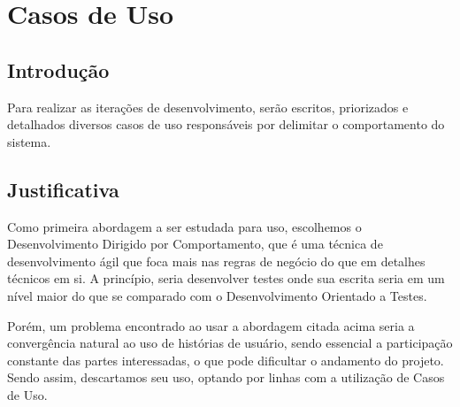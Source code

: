 \chapter{Casos de Uso}

\section{Introdução}
Para realizar as iterações de desenvolvimento, serão escritos, priorizados e detalhados diversos casos de uso responsáveis por delimitar o comportamento do sistema.

\section{Justificativa}
Como primeira abordagem a ser estudada para uso, escolhemos o Desenvolvimento Dirigido por Comportamento, que é uma técnica de desenvolvimento ágil que foca mais nas regras de negócio do que em detalhes técnicos em si. A princípio, seria desenvolver testes onde sua escrita seria em um nível maior do que se comparado com o Desenvolvimento Orientado a Testes.
  
Porém, um problema encontrado ao usar a abordagem citada acima seria a convergência natural ao uso de histórias de usuário, sendo essencial a participação constante das partes interessadas, o que pode dificultar o andamento do projeto. Sendo assim, descartamos seu uso, optando por linhas com a utilização de Casos de Uso.
